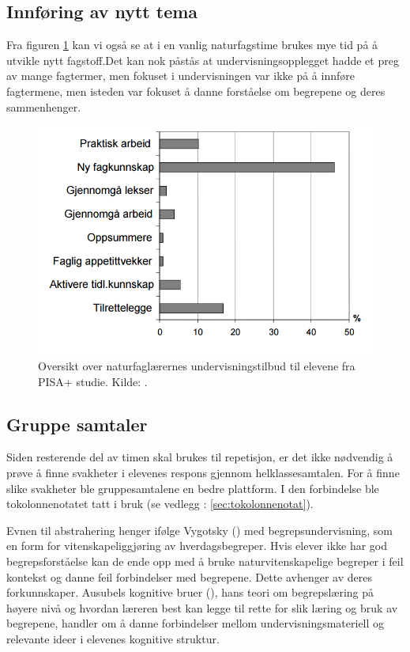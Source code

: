 \documentclass[main.tex]{subfiles}
\begin{document}
\subsection*{Innføring av nytt tema}
Fra figuren \ref{fig:odeg10} kan vi også se at i en vanlig naturfagstime brukes mye tid på å utvikle 
nytt fagstoff.Det kan nok påstås at undervisningsopplegget hadde et preg av mange fagtermer, men 
fokuset i undervisningen var ikke på å innføre fagtermene, men isteden var fokuset å danne forståelse 
om begrepene og deres sammenhenger. 

\begin{figure}[h!]
\includegraphics[scale = 0.6]{../figures/undervisnings_aktivitet.png}
\caption{Oversikt over naturfaglærernes undervisningstilbud til elevene fra PISA+ studie. Kilde: \protect{}.}
\label{fig:odeg10}
\end{figure}




\subsection*{Gruppe samtaler}
Siden resterende del av timen skal brukes til repetisjon, er det ikke nødvendig å 
prøve å finne svakheter i elevenes respons gjennom helklassesamtalen. For å finne slike svakheter 
ble gruppesamtalene en bedre plattform. I den forbindelse ble tokolonnenotatet tatt i bruk (se 
vedlegg : \ref{sec:tokolonnenotat}).

Evnen til abstrahering henger ifølge Vygotsky () med begrepsundervisning, som en
form for vitenskapeliggjøring av hverdagsbegreper. Hvis elever ikke har god begrepsforståelse
kan de ende opp med å bruke naturvitenskapelige begreper i feil kontekst og danne feil 
forbindelser med begrepene. Dette avhenger av deres forkunnskaper. Ausubels kognitive bruer 
(), hans teori om begrepslæring på høyere nivå og hvordan læreren best kan 
legge til rette for slik læring og bruk av begrepene,  handler om å danne forbindelser mellom 
undervisningsmateriell og relevante ideer i elevenes kognitive struktur.
\end{document}

